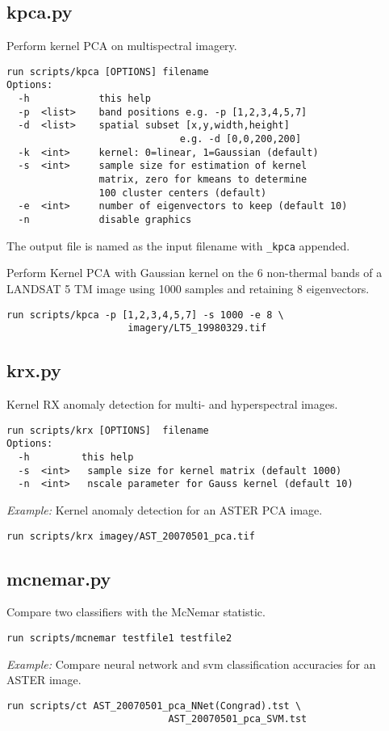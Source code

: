 \documentclass{paper}
\begin{document}
\subsection*{kpca.py}


Perform kernel PCA on multispectral imagery.
\begin{verbatim}
run scripts/kpca [OPTIONS] filename
Options:
  -h            this help
  -p  <list>    band positions e.g. -p [1,2,3,4,5,7]
  -d  <list>    spatial subset [x,y,width,height]
                              e.g. -d [0,0,200,200]
  -k  <int>     kernel: 0=linear, 1=Gaussian (default)
  -s  <int>     sample size for estimation of kernel
                matrix, zero for kmeans to determine
                100 cluster centers (default)
  -e  <int>     number of eigenvectors to keep (default 10)
  -n            disable graphics
\end{verbatim}
The output file is named as the input filename with {\tt \_kpca} appended.


\vskip 0.2cm


 Perform Kernel PCA with Gaussian kernel on the 6 non-thermal bands of a LANDSAT 5 TM image using 1000 samples and retaining 8 eigenvectors.
\begin{lstlisting}
run scripts/kpca -p [1,2,3,4,5,7] -s 1000 -e 8 \
                     imagery/LT5_19980329.tif
\end{lstlisting}







\subsection*{krx.py}
Kernel RX anomaly detection for multi- and hyperspectral images.
\begin{verbatim}
run scripts/krx [OPTIONS]  filename
Options:
  -h         this help
  -s  <int>   sample size for kernel matrix (default 1000)
  -n  <int>   nscale parameter for Gauss kernel (default 10)
\end{verbatim}
{\it Example:} Kernel anomaly detection for an ASTER PCA image.
\begin{lstlisting}
run scripts/krx imagey/AST_20070501_pca.tif
\end{lstlisting}





\subsection*{mcnemar.py}
Compare two classifiers with the McNemar statistic.
\begin{verbatim}
run scripts/mcnemar testfile1 testfile2
\end{verbatim}
{\it Example:} Compare neural network and svm classification accuracies for an ASTER image.
\begin{lstlisting}
run scripts/ct AST_20070501_pca_NNet(Congrad).tst \
                            AST_20070501_pca_SVM.tst
\end{lstlisting}
\end{document}
